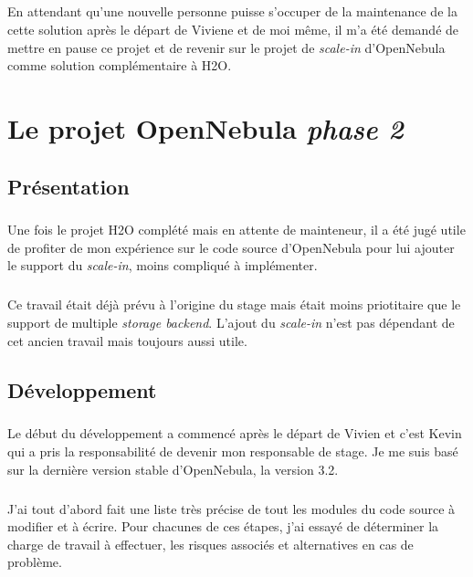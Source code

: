 \paragraph*{}
En attendant qu'une nouvelle personne puisse s'occuper de la maintenance de la cette solution après le départ de Viviene et de moi même, il m'a été demandé de mettre en pause ce projet
et de revenir sur le projet de \emph{scale-in} d'OpenNebula comme solution complémentaire à H2O.


\chapter{Le projet OpenNebula \emph{phase 2}}

\section{Présentation}
\paragraph*{}
Une fois le projet H2O complété mais en attente de mainteneur, il a été jugé utile de profiter de mon expérience sur le code source d'OpenNebula pour lui ajouter
le support du \emph{scale-in}, moins compliqué à implémenter.

\paragraph*{}
Ce travail était déjà prévu à l'origine du stage mais était moins priotitaire que le support de multiple \emph{storage backend}.
L'ajout du \emph{scale-in} n'est pas dépendant de cet ancien travail mais toujours aussi utile.\\

\section{Développement}
\paragraph*{}
Le début du développement a commencé après le départ de Vivien et c'est Kevin qui a pris la responsabilité de devenir mon responsable de stage.
Je me suis basé sur la dernière version stable d'OpenNebula, la version 3.2.

\paragraph*{}
J'ai tout d'abord fait une liste très précise de tout les modules du code source à modifier et à écrire. Pour chacunes de ces étapes, j'ai essayé de déterminer
la charge de travail à effectuer, les risques associés et alternatives en cas de problème.

